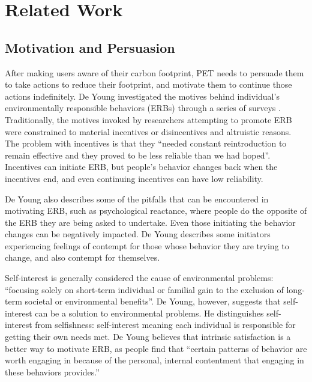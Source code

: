 \chapter{Related Work}



\section{Motivation and Persuasion}

After making users aware of their carbon footprint, PET needs to persuade them to take actions to reduce their footprint, and motivate them to continue those actions indefinitely. De Young investigated the motives behind individual's environmentally responsible behaviors (ERBs) through a series of surveys \cite{Young:2000fv}. Traditionally, the motives invoked by researchers attempting to promote ERB were constrained to material incentives or disincentives and altruistic reasons. The problem with incentives is that they ``needed constant reintroduction to remain effective and they proved to be less reliable than we had hoped''. Incentives can initiate ERB, but people's behavior changes back when the incentives end, and even continuing incentives can have low reliability.

De Young also describes some of the pitfalls that can be encountered in motivating ERB, such as psychological reactance, where people do the opposite of the ERB they are being asked to undertake. Even those initiating the behavior changes can be negatively impacted. De Young describes some initiators experiencing feelings of contempt for those whose behavior they are trying to change, and also contempt for themselves.

Self-interest is generally considered the cause of environmental problems: ``focusing solely on short-term individual or familial gain to the exclusion of long-term societal or environmental benefits''. De Young, however, suggests that self-interest can be a solution to environmental problems. He distinguishes self-interest from selfishness: self-interest meaning each individual is responsible for getting their own needs met. De Young believes that intrinsic satisfaction is a better way to motivate ERB, as people find that ``certain patterns of behavior are worth engaging in because of the personal, internal contentment that engaging in these behaviors provides.''

